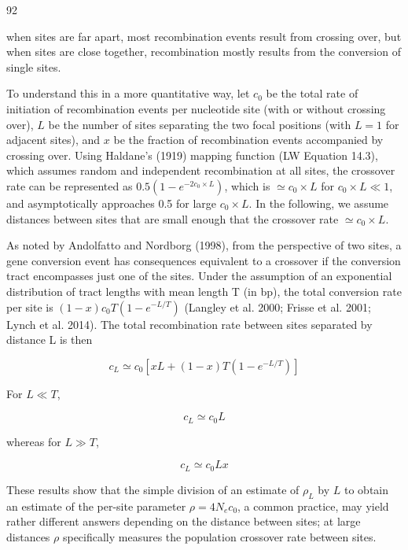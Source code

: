 \documentclass{article}
\begin{document}
92

when sites are far apart, most recombination events result from crossing over, but when sites are close together, recombination mostly results from the conversion of single sites.

To understand this in a more quantitative way, let  $ c_0 $ be the total rate of initiation of recombination events per nucleotide site (with or without crossing over),  $ L $ be the number of sites separating the two focal positions (with  $ L = 1 $ for adjacent sites), and  $ x $ be the fraction of recombination events accompanied by crossing over. Using Haldane's (1919) mapping function (LW Equation 14.3), which assumes random and independent recombination at all sites, the crossover rate can be represented as  $ 0.5(1 - e^{-2c_0 \times L}) $, which is  $ \simeq c_0 \times L $ for  $ c_0 \times L \ll 1 $, and asymptotically approaches 0.5 for large  $ c_0 \times L $. In the following, we assume distances between sites that are small enough that the crossover rate  $ \simeq c_0 \times L $.

As noted by Andolfatto and Nordborg (1998), from the perspective of two sites, a gene conversion event has consequences equivalent to a crossover if the conversion tract encompasses just one of the sites. Under the assumption of an exponential distribution of tract lengths with mean length T (in bp), the total conversion rate per site is  $ (1 - x)c_0T(1 - e^{-L/T}) $ (Langley et al. 2000; Frisse et al. 2001; Lynch et al. 2014). The total recombination rate between sites separated by distance L is then

\begin{equation}
c_{L}\simeq c_{0}[x L+(1-x)T(1-e^{-L/T})]
\tag{4.16a}
\label{eq:4_16a}
\end{equation}

For  $ L \ll T $,

\begin{equation}
c_{L}\simeq c_{0}L
\tag{4.16b}
\label{eq:4_16b}
\end{equation}

whereas for  $ L \gg T $,

\begin{equation}
c_{L}\simeq c_{0}L x
\tag{4.16c}
\label{eq:4_16c}
\end{equation}

These results show that the simple division of an estimate of  $ \rho_L $ by  $ L $ to obtain an estimate of the per-site parameter  $ \rho = 4N_e c_0 $, a common practice, may yield rather different answers depending on the distance between sites; at large distances  $ \rho $ specifically measures the population crossover rate between sites.
\end{document}
